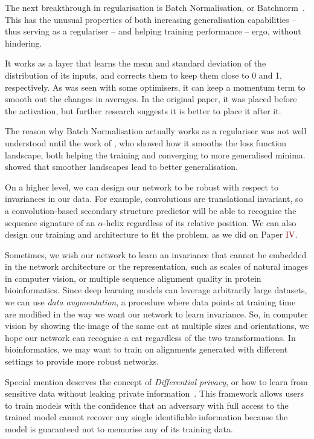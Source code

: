 The next breakthrough in regularisation is Batch Normalisation, 
or Batchnorm~\citep{bn}.
This has the unusual properties of both increasing generalisation capabilities -- thus serving as a regulariser -- and helping training performance -- ergo, without hindering.

It works as a layer that learns the mean and standard deviation of the distribution of its inputs, and corrects them to keep them close to 0 and 1, respectively.
As was seen with some optimisers, it can keep a momentum term to smooth out the changes in averages.
In the original paper, it was placed before the activation, but further research suggests it is better to place it after it.

The reason why Batch Normalisation actually works as a regulariser was not well understood until the work of \citet{how_bn_works}, who showed how it smooths the loss function landscape, both helping the training and converging to more generalised minima.
\citet{large_batch} showed that smoother landscapes lead to better generalisation.

On a higher level,
we can design our network to be robust with respect to invariances in our data.
For example, convolutions are translational invariant, so a convolution-based secondary structure predictor will be able to recognise the sequence signature of an $\alpha$-helix regardless of its relative position.
We can also  design our training and architecture to fit the problem, as we did on Paper \textcolor{Maroon}{IV}.

Sometimes,  we wish our network to learn an invariance that cannot be embedded in the network architecture or the representation, such as scales of natural images in computer vision, or multiple sequence alignment quality in protein bioinformatics.
Since deep learning models can leverage arbitrarily large datasets, we can use \emph{data augmentation}, a procedure where data points at training time are modified in the way we want our network to learn invariance.
So, in computer vision by showing the image of the same cat at multiple sizes and orientations, we hope our network can recognise a cat regardless of the two transformations.
In bioinformatics, we may want to train on alignments generated with different settings to provide more robust networks.

Special mention deserves the concept of \emph{Differential privacy}, 
or how to learn from sensitive data without leaking private information~\citep{differential_privacy}.
This framework allows users to train models with the confidence that an adversary with full access to the trained model cannot recover any single identifiable information because the model is guaranteed not to memorise any of its training data.

